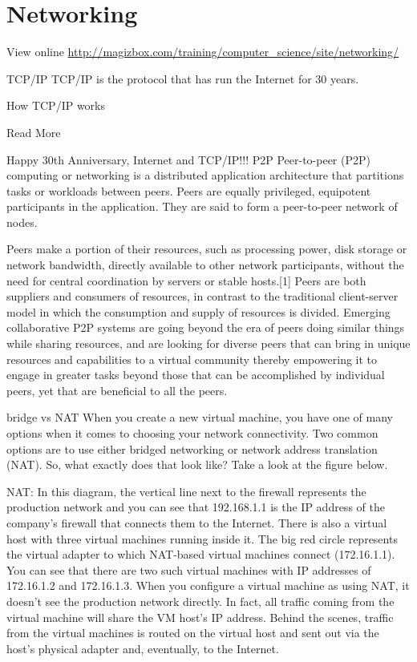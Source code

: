 \chapter{Networking}

View online \href{http://magizbox.com/training/computer_science/site/networking/}{http://magizbox.com/training/computer_science/site/networking/}

TCP/IP
TCP/IP is the protocol that has run the Internet for 30 years.

How TCP/IP works



Read More

Happy 30th Anniversary, Internet and TCP/IP!!!
P2P
Peer-to-peer (P2P) computing or networking is a distributed application architecture that partitions tasks or workloads between peers. Peers are equally privileged, equipotent participants in the application. They are said to form a peer-to-peer network of nodes.



Peers make a portion of their resources, such as processing power, disk storage or network bandwidth, directly available to other network participants, without the need for central coordination by servers or stable hosts.[1] Peers are both suppliers and consumers of resources, in contrast to the traditional client-server model in which the consumption and supply of resources is divided. Emerging collaborative P2P systems are going beyond the era of peers doing similar things while sharing resources, and are looking for diverse peers that can bring in unique resources and capabilities to a virtual community thereby empowering it to engage in greater tasks beyond those that can be accomplished by individual peers, yet that are beneficial to all the peers.

bridge vs NAT
When you create a new virtual machine, you have one of many options when it comes to choosing your network connectivity. Two common options are to use either bridged networking or network address translation (NAT). So, what exactly does that look like? Take a look at the figure below.



NAT: In this diagram, the vertical line next to the firewall represents the production network and you can see that 192.168.1.1 is the IP address of the company’s firewall that connects them to the Internet. There is also a virtual host with three virtual machines running inside it. The big red circle represents the virtual adapter to which NAT-based virtual machines connect (172.16.1.1). You can see that there are two such virtual machines with IP addresses of 172.16.1.2 and 172.16.1.3. When you configure a virtual machine as using NAT, it doesn’t see the production network directly. In fact, all traffic coming from the virtual machine will share the VM host’s IP address. Behind the scenes, traffic from the virtual machines is routed on the virtual host and sent out via the host’s physical adapter and, eventually, to the Internet.

